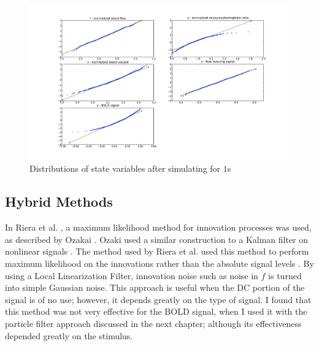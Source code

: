 \begin{figure}
\includegraphics[trim=6cm .75cm 6cm .75cm,width=16cm]{images/gauss_step_1sec_3sigma.pdf}
\caption{Distributions of state variables after simulating for $1$s}
\label{fig:trans1s}
\end{figure}

\subsection{Hybrid Methods}
In Riera et al. , a maximum
likelihood method for innovation processes was used, as described by
Ozakai \cite{Riera2003,Ozaki1994}. Ozaki used a similar construction to a 
Kalman filter on nonlinear signals \cite{Ozaki1994}. 
The method used by Riera et al. used this method to perform maximum likelihood on
the innovations rather than the absolute signal levels \cite{Riera2003}. 
By using a Local Linearization Filter,
innovation noise such as noise in $\dot{f}$ is turned into simple 
Gaussian noise. This approach is useful when the DC portion of the signal is
of no use; however, it depends greatly on the type of signal. I found that
this method was not very effective for the BOLD signal, when I used it 
with the particle filter approach discussed in the next chapter; although its
effectiveness depended greatly on the stimulus.

